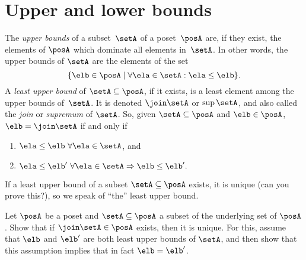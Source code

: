 
\section{Upper and lower bounds}
\begin{definition}\label{def:least-upper-bound}
    The \emph{upper bounds} of a subset~$\setA$ of a poset~$\posA$ are, if they exist, the elements of $\posA$ which dominate all elements in~$\setA$. In other words, the upper bounds of $\setA$ are the elements of the set
    $$
    \{ \elb \in \posA \mid \forall \ela \in \setA  : \ela \leq \elb \}.
    $$
    A \emph{least upper bound} of $\setA \subseteq \posA$, if it exists, is a least element among the upper bounds of~$\setA$. It is denoted $\join \setA$ or $\sup\setA$, and also called the \emph{join} or \emph{supremum} of $\setA$. So, given $\setA \subseteq \posA$ and $\elb \in \posA$, $\elb =  \join \setA$ if and only if
\begin{enumerate}
 \item $\ela \leq \elb \ \forall \ela \in \setA$, and
 \item $\ela \leq \elb' \ \forall \ela \in \setA \Rightarrow \elb \leq \elb'.$
\end{enumerate}
   If a least upper bound of a subset $\setA \subseteq \posA$ exists, it is unique (can you prove this?), so we speak of ``the'' least upper bound.
\end{definition}

\begin{exercise}
Let $\posA$ be a poset and $\setA \subseteq \posA$ a subset of the underlying set of $\posA$. Show that if $\join \setA \in \posA$ exists, then it is unique. For this, assume that $\elb$ and $\elb'$ are both least upper bounds of $\setA$, and then show that this assumption implies that in fact $\elb = \elb'$.
\end{exercise}
\begin{solution}
    \end{solution}


